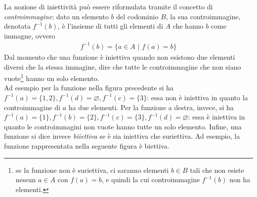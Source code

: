 \documentclass{book}
\theoremstyle{definition}
\theoremstyle{plain}
\begin{document}
La nozione di iniettività può essere riformulata tramite il concetto di \textit{controimmagine}: dato
un elemento $b$ del codominio $B$, la sua controimmagine, denotata $f^{-1}(b)$, è l'insieme di tutti gli
elementi di $A$ che hanno $b$ come immagne, ovvero
\begin{eqnarray*}
  f^{-1}(b)=\{a\in A \text{ | } f(a)=b\}
\end{eqnarray*}
Dal momento che una funzione è iniettiva quando non esistono due elementi diversi che la stessa immagine,
dire che tutte le controimmagine che non siano vuote\footnote{se la funzione non è suriettiva, ci
  saranno elementi $b\in B$ tali che non esiste nessun $a\in A$ con $f(a)=b$, e quindi la cui
  controimmagine $f^{-1}(b)$ non ha elementi.} hanno un solo elemento.\\
Ad esempio per la funzione nella figura precedente si ha $f^{-1}(a)=\{1,2\},f^{-1}(d)=\diameter,
f^{-1}(c)=\{3\}$: essa non è iniettiva in quanto la controimmagine di $a$ ha due elementi. Per la
funzione a destra, invece, si ha $f^{-1}(a)=\{1\},f^{-1}(b)=\{2\}, f^{-1}(c)=\{3\},f^{-1}(d)=\diameter$:
essa è iniettiva in quanto le controimmagini non vuote hanno tutte un solo elemento. Infine, una funzione
si dice invece \textit{biiettiva} se è sia iniettiva che suriettiva. Ad esempio, la funzione
rappresentata nella seguente figura è biettiva.
\end{document}
